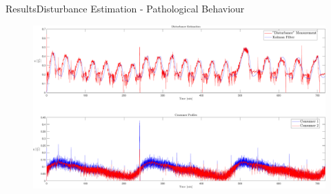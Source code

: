 \begin{frame}{Results}{Disturbance Estimation - Pathological Behaviour}
	\begin{figure}[h!]
		\includegraphics[width=\linewidth]{Graphics/DisturbanceEstimationBad.pdf}
		\label{fig:DisturbanceEstimationBad}
	\end{figure}
\end{frame}












